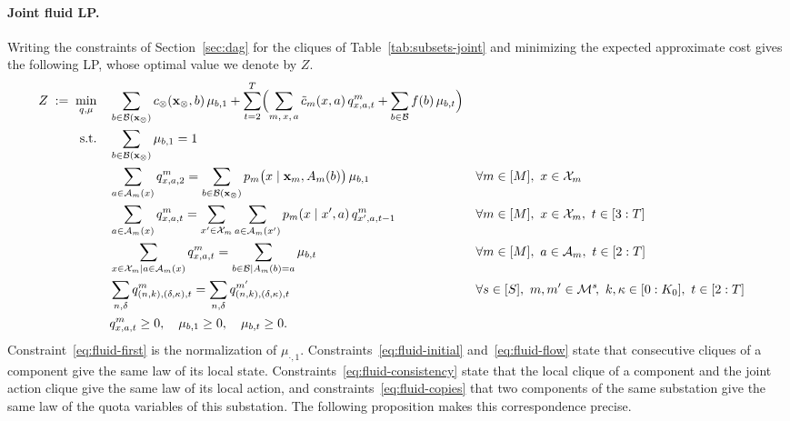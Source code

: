 \documentclass{article}
\begin{document}
\paragraph{Joint fluid LP.}
Writing the constraints of Section~\ref{sec:dag} for the cliques of Table~\ref{tab:subsets-joint} and minimizing the
expected approximate cost gives the following LP, whose optimal value we denote by $Z$.
\begin{subequations}\label{eq:fluid}
\begin{align}
Z \;:=\; \min_{q,\mu} \quad
& \sum_{b \in \mathcal{B}(\mathbf{x}_\otimes)} c_\otimes(\mathbf{x}_\otimes, b)\, \mu_{b,1}
  + \sum_{t=2}^{T} \Bigl( \sum_{m,\, x,\, a} \tilde c_m(x,a)\, q^m_{x,a,t}
    + \sum_{b \in \mathcal{B}} f(b)\, \mu_{b,t} \Bigr)
\label{eq:fluid-obj}\\
\text{s.t.} \quad
& \sum_{b \in \mathcal{B}(\mathbf{x}_\otimes)} \mu_{b,1} = 1
\label{eq:fluid-first}\\
& \sum_{a \in \mathcal{A}_m(x)} q^m_{x,a,2} = \sum_{b \in \mathcal{B}(\mathbf{x}_\otimes)} p_m\big(x \mid
  \mathbf{x}_m, A_m(b)\big)\, \mu_{b,1}
  && \forall m \in [M],\ x \in \mathcal{X}_m
\label{eq:fluid-initial}\\
& \sum_{a \in \mathcal{A}_m(x)} q^m_{x,a,t}
  = \sum_{x' \in \mathcal{X}_m} \sum_{a \in \mathcal{A}_m(x')} p_m(x \mid x',a)\, q^m_{x',a,t-1}
  && \forall m \in [M],\ x \in \mathcal{X}_m,\ t \in [3:T]
\label{eq:fluid-flow}\\
& \sum_{x \in \mathcal{X}_m \mid a \in \mathcal{A}_m(x)} q^m_{x,a,t}
  = \sum_{b \in \mathcal{B} \mid A_m(b)=a} \mu_{b,t}
  && \forall m \in [M],\ a \in \mathcal{A}_m,\ t \in [2:T]
\label{eq:fluid-consistency}\\
& \sum_{n, \delta} q^m_{(n,k),(\delta,\kappa),t} = \sum_{n, \delta} q^{m'}_{(n,k),(\delta,\kappa),t}
  && \forall s \in [S],\ m, m' \in \mathcal{M}^s\!,\ k, \kappa \in [0:K_0],\ t \in [2:T]
\label{eq:fluid-copies}\\
& q^m_{x,a,t} \geq 0, \quad \mu_{b,1} \geq 0, \quad \mu_{b,t} \geq 0.
\label{eq:fluid-nonneg}
\end{align}
\end{subequations}
Constraint~\eqref{eq:fluid-first} is the normalization of $\mu_{\cdot,1}$. Constraints~\eqref{eq:fluid-initial}
and~\eqref{eq:fluid-flow} state that consecutive cliques of a component give the same law of its local state.
Constraints~\eqref{eq:fluid-consistency} state that the local clique of a component and the joint action clique give the
same law of its local action, and constraints~\eqref{eq:fluid-copies} that two components of the same substation give
the same law of the quota variables of this substation. The following proposition makes this correspondence precise.
\end{document}
